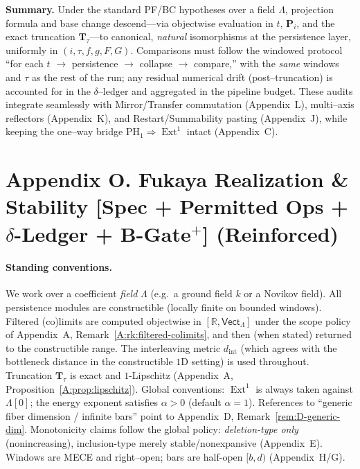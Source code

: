 \documentclass[11pt]{article}
\numberwithin{equation}{section}
\theoremstyle{plain}
\theoremstyle{definition}
\theoremstyle{remark}
\DeclareMathOperator{\Ext}{Ext}
\DeclareRobustCommand{\hyp}{\nobreakdash-}
\theoremstyle{plain}
\theoremstyle{definition}
\numberwithin{equation}{section}
\theoremstyle{definition}
\numberwithin{equation}{section}
\theoremstyle{plain}
\theoremstyle{definition}
\theoremstyle{remark}
\begin{document}
\medskip
\noindent\textbf{Summary.}
Under the standard PF/BC hypotheses over a field \(\Lambda\), projection formula and base change descend—via objectwise evaluation in \(t\), \(\mathbf{P}_i\), and the exact truncation \(\mathbf{T}_\tau\)—to canonical, \emph{natural} isomorphisms at the persistence layer, uniformly in \((i,\tau,f,g,F,G)\).
Comparisons must follow the windowed protocol “for each \(t\) \(\to\) persistence \(\to\) collapse \(\to\) compare,” with the \emph{same} windows and \(\tau\) as the rest of the run; any residual numerical drift (post–truncation) is accounted for in the \(\delta\)–ledger and aggregated in the pipeline budget.
These audits integrate seamlessly with Mirror/Transfer commutation (Appendix~L), multi–axis reflectors (Appendix~K), and Restart/Summability pasting (Appendix~J), while keeping the one–way bridge \(\mathrm{PH}_1\Rightarrow \Ext^1\) intact (Appendix~C).



\section*{Appendix O. Fukaya Realization \& Stability [Spec + Permitted Ops + $\delta$-Ledger + B-Gate$^{+}$] (Reinforced)}
{}
\label{O:fukaya}

\paragraph{Standing conventions.}
We work over a coefficient \emph{field} \(\Lambda\) (e.g.\ a ground field \(k\) or a Novikov field).
All persistence modules are constructible (locally finite on bounded windows).
Filtered (co)limits are computed objectwise in \([\mathbb{R},\mathsf{Vect}_\Lambda]\) under the scope policy of Appendix~A, Remark~\ref{A:rk:filtered-colimits}, and then (when stated) returned to the constructible range.
The interleaving metric \(d_{\mathrm{int}}\) (which agrees with the bottleneck distance in the constructible \(1\)D setting) is used throughout.
Truncation \(\mathbf{T}_\tau\) is exact and \(1\)\hyp Lipschitz (Appendix~A, Proposition~\ref{A:prop:lipschitz}).
Global conventions: \(\Ext^1\) is always taken against \(\Lambda[0]\); the energy exponent satisfies \(\alpha>0\) (default \(\alpha=1\)).
References to “generic fiber dimension / infinite bars” point to Appendix~D, Remark~\ref{rem:D-generic-dim}.
Monotonicity claims follow the global policy: \emph{deletion-type only} (nonincreasing), inclusion-type merely stable/nonexpansive (Appendix~E).
Windows are MECE and right–open; bars are half-open \([b,d)\) (Appendix~H/G).
\end{document}
